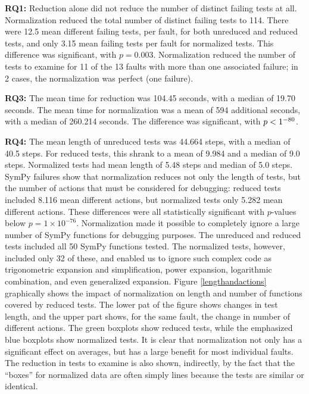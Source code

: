 {\bf RQ1:} Reduction alone did not reduce the number of distinct failing tests at
all.  Normalization reduced the total number of distinct
failing tests to 114.  There were
12.5 mean different failing tests, per fault, for both unreduced and
reduced tests, and only 3.15 mean failing tests per fault for
normalized tests.  This difference was significant, with $p=0.003$.
Normalization reduced the number of tests to
examine for 11 of the 13 faults with more than one associated failure; in 2 cases, the normalization was perfect (one failure).

{\bf RQ3:} The mean time for reduction was 104.45 seconds, with a
median of 19.70 seconds.  The mean time for normalization was a mean of
594 additional seconds, with a median of 260.214 seconds.  The
difference was significant, with $p<1\time10^{-80}$.

{\bf RQ4:} The mean length of unreduced tests was 44.664 steps, with a median
of 40.5 steps.  For reduced tests, this shrank to a mean of
9.984 and a median of 9.0 steps.  Normalized tests had mean length of
5.48 steps and median of 5.0 steps.  SymPy failures show
that normalization reduces not only the length of tests, but the number of
actions that must be considered for debugging:  reduced tests included
8.116 mean different actions, but normalized tests only 5.282
mean different actions.  These differences were all statistically
significant with $p$-values below $p=1\times10^{-76}$.  
Normalization made it possible to completely ignore a large number of
SymPy functions for debugging purposes.  The unreduced and reduced
tests included all 50 SymPy functions tested.  The normalized tests,
however, included only 32 of these, and enabled us to ignore such
complex code as trigonometric expansion and simplification, power expansion,
logarithmic combination, and even generalized expansion.  Figure
\ref{lengthandactions} graphically shows the impact of normalization
on length and number of functions covered by reduced tests.  The lower
pat of the figure shows changes in test length, and the upper part
shows, for the same fault, the change in number of different actions.
The green boxplots show reduced tests, while the emphasized blue
boxplots show normalized tests.  It is clear that normalization not
only has a significant effect on averages, but has a large benefit for
most individual faults.  The reduction in tests to examine
is also shown, indirectly, by the fact that the ``boxes'' for
normalized data are often simply lines because the tests are similar or identical.

